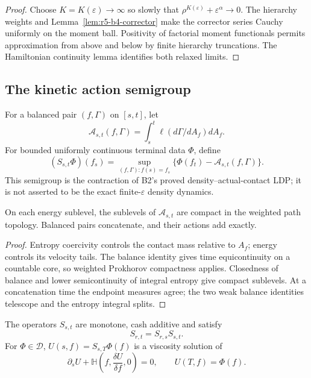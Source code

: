 \begin{proof}
Choose \(K=K(\varepsilon)\to\infty\) so slowly that
\(\rho^{K(\varepsilon)}+\varepsilon^\alpha\to0\).  The hierarchy weights and
Lemma~\ref{lem:r5-b4-corrector} make the corrector series Cauchy uniformly on
the moment ball.  Positivity of factorial moment functionals permits
approximation from above and below by finite hierarchy truncations.  The
Hamiltonian continuity lemma identifies both relaxed limits.
\end{proof}

\subsection{The kinetic action semigroup}

For a balanced pair \((f,\Gamma)\) on \([s,t]\), let
\[
 \mathcal A_{s,t}(f,\Gamma)=
 \int_s^t\ell(d\Gamma/dA_f)dA_f.
\]
For bounded uniformly continuous terminal data \(\Phi\), define
\[
 (S_{s,t}\Phi)(f_s)=
 \sup_{(f,\Gamma):f(s)=f_s}
 \{\Phi(f_t)-\mathcal A_{s,t}(f,\Gamma)\}.
\]
This semigroup is the contraction of B2's proved density--actual-contact LDP;
it is not asserted to be the exact finite-\(\varepsilon\) density dynamics.

\begin{lemma}
\label{lem:r5-b4-action-compact}
On each energy sublevel, the sublevels of \(\mathcal A_{s,t}\) are compact in
the weighted path topology.  Balanced pairs concatenate, and their actions
add exactly.
\end{lemma}

\begin{proof}
Entropy coercivity controls the contact mass relative to \(A_f\); energy
controls its velocity tails.  The balance identity gives time equicontinuity
on a countable core, so weighted Prokhorov compactness applies.  Closedness of
balance and lower semicontinuity of integral entropy give compact sublevels.
At a concatenation time the endpoint measures agree; the two weak balance
identities telescope and the entropy integral splits.
\end{proof}

\begin{theorem}
\label{thm:r5-b4-action}
The operators \(S_{s,t}\) are monotone, cash additive and satisfy
\[
 S_{r,t}=S_{r,s}S_{s,t}.
\]
For \(\Phi\in\mathscr D\), \(U(s,f)=S_{s,T}\Phi(f)\) is a viscosity solution
of
\[
 \partial_sU+
 \mathbb H\left(f,\frac{\delta U}{\delta f},0\right)=0,
 \qquad U(T,f)=\Phi(f).
\]
\end{theorem}

